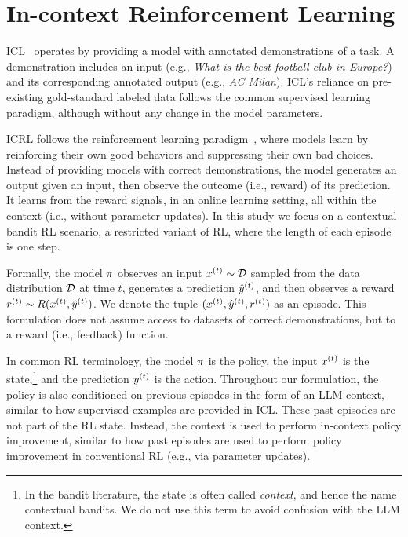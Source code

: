

\section{In-context Reinforcement Learning}\label{sec:icrl}

ICL~\citep{brown2020language} operates by providing a model with  annotated demonstrations of a task. 
A demonstration includes an input (e.g., \textit{What is the best football club in Europe?}) and its corresponding annotated output (e.g., \textit{AC Milan}).
ICL's reliance on pre-existing gold-standard labeled data follows the common supervised learning paradigm, although without any change in the model parameters.

ICRL follows the reinforcement learning paradigm~\citep{sutton2018reinforcement}, where models learn by reinforcing their own good behaviors and suppressing their own bad choices. 
Instead of providing models with correct demonstrations, the model generates an output given an input, then observe the outcome (i.e., reward) of its prediction. It  learns from the reward signals, in an online learning setting, all within the context (i.e., without parameter updates). 
In this study we focus on a contextual bandit RL scenario, a restricted variant of RL, where the length of each episode is one step. 

Formally, the model $\pi$ observes an input $x^{(t)} \sim \mathcal{D}$ sampled from the data distribution $\mathcal{D}$ at time $t$, generates a prediction $\hat{y}^{(t)}$, and then observes a reward $r^{(t)} \sim R(x^{(t)}, \hat{y}^{(t)})$. We denote the tuple $(x^{(t)}, \hat{y}^{(t)}, r^{(t)})$ as an episode. 
This formulation does not assume access to datasets of correct demonstrations, but to a reward (i.e., feedback) function. 


In common RL terminology, the model $\pi$ is the policy, the input $x^{(t)}$ is the state,\footnote{In the bandit literature, the state is often called \emph{context}, and hence the name contextual bandits. We do not use this term to avoid confusion with the LLM context.} and the prediction $y^{(t)}$ is the action. 
Throughout our formulation, the policy is also conditioned on previous episodes in the form of an LLM context, similar to how supervised examples are provided in ICL. 
These past episodes are not part of the RL state. 
Instead, the context is used to perform in-context policy improvement, similar to how past episodes are used to perform policy improvement in conventional RL (e.g., via parameter updates). 



